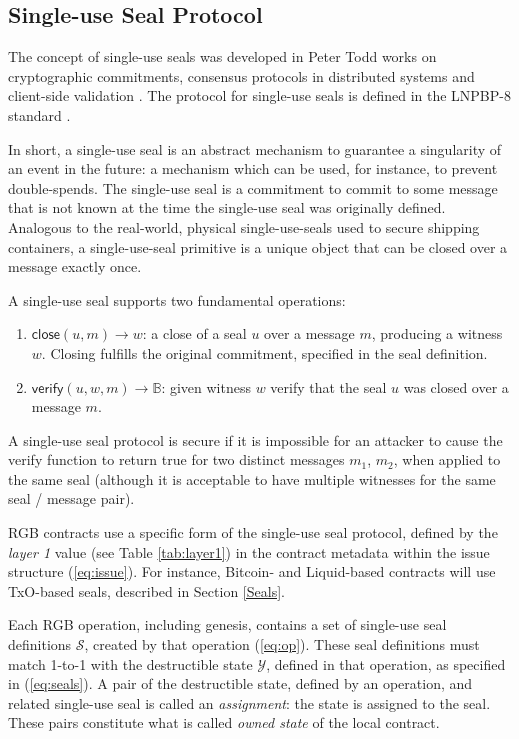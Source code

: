 \documentclass[9pt,oneside]{amsart}
\begin{document}
\begin{multicols}{2}


\subsection{Single-use Seal Protocol}\label{SUS}

The concept of single-use seals was developed in Peter Todd works on cryptographic commitments,
consensus protocols in distributed systems and client-side validation \cite{SUS1, SUS2, SUS3, SUS4}.
The protocol for single-use seals is defined in the LNPBP-8 standard \cite{LNPBP8}.

In short, a single-use seal is an abstract mechanism to guarantee
a singularity of an event in the future:
a mechanism which can be used, for instance, to prevent double-spends.
The single-use seal is a commitment to commit to some message that is not known
at the time the single-use seal was originally defined.
Analogous to the real-world, physical single-use-seals used to secure shipping containers,
a single-use-seal primitive is a unique object that can be closed over a message exactly once.

A single-use seal supports two fundamental operations:
\begin{enumerate}
    \item $\mathsf{close}(u,m) \rightarrow w$: a close of a seal $u$ over a message $m$, producing a witness $w$.
    Closing fulfills the original commitment, specified in the seal definition.
    \item $\mathsf{verify}(u,w,m) \rightarrow \mathbb{B}$: 
    given witness $w$ verify that the seal $u$ was closed over a message $m$.
\end{enumerate}

A single-use seal protocol is secure if it is impossible for an attacker
to cause the \textsf{verify} function to return \textsf{true}
for two distinct messages $m_1$, $m_2$, when applied to the same seal
(although it is acceptable to have multiple witnesses for the same seal / message pair).

RGB contracts use a specific form of the single-use seal protocol,
defined by the \emph{layer 1} value (see Table \ref{tab:layer1})
in the contract metadata within the issue structure (\ref{eq:issue}).
For instance, Bitcoin- and Liquid-based contracts will use TxO-based seals,
described in Section \ref{Seals}.

Each RGB operation, including genesis, contains a set of single-use seal definitions $\mathcal{S}$,
created by that operation (\ref{eq:op}).
These seal definitions must match 1-to-1 with the destructible state $\mathcal{Y}$,
defined in that operation, as specified in (\ref{eq:seals}).
A pair of the destructible state, defined by an operation, and related single-use seal
is called an \emph{assignment}: the state is assigned to the seal.
These pairs constitute what is called \emph{owned state} of the local contract.


\end{multicols}
\end{document}
